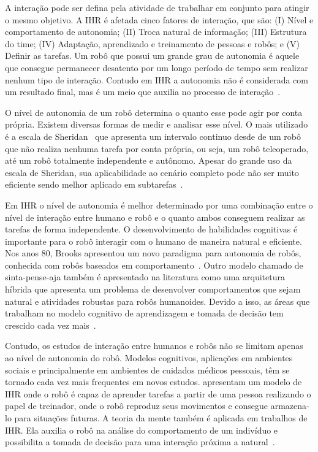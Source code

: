 A interação pode ser defina pela atividade de trabalhar em conjunto para atingir o mesmo objetivo. A IHR é afetada cinco fatores de interação, que são: (I) Nível e comportamento de autonomia; (II) Troca natural de informação; (III) Estrutura do time; (IV) Adaptação, aprendizado e treinamento de pessoas e robôs; e (V) Definir as tarefas. Um robô que possui um grande grau de autonomia é aquele que consegue permanecer desatento por um longo período de tempo sem realizar nenhum tipo de interação. Contudo em IHR a autonomia não é considerada com um resultado final, mas é um meio que auxilia no processo de interação~\cite{Goodrich:2007, Weiss:2010}.

O nível de autonomia de um robô determina o quanto esse pode agir por conta própria. Existem diversas formas de medir e analisar esse nível. O mais utilizado é a escala de Sheridan~\cite{Sheridan:1978} que apresenta um intervalo continuo desde de um robô que não realiza nenhuma tarefa por conta própria, ou seja, um robô teleoperado, até um robô totalmente independente e autônomo. Apesar do grande uso da escala de Sheridan, sua aplicabilidade ao cenário completo pode não ser muito eficiente sendo melhor aplicado em subtarefas~\cite{Goodrich:2007, Weiss:2010}.

Em IHR o nível de autonomia é melhor determinado por uma combinação entre o nível de interação entre humano e robô e o quanto ambos conseguem realizar as tarefas de forma independente. O desenvolvimento de habilidades cognitivas é importante para o robô interagir com o humano de maneira natural e eficiente. Nos anos 80, Brooks apresentou um novo paradigma para autonomia de robôs, conhecida com robôs baseados em comportamento~\cite{Brooks:1986, Brooks:1991}. Outro modelo chamado de sinta-pense-aja também é apresentado na literatura como uma arquitetura híbrida que apresenta um problema de desenvolver comportamentos que sejam natural e atividades robustas para robôs humanoides. Devido a isso, as áreas que trabalham no modelo cognitivo de aprendizagem e tomada de decisão tem crescido cada vez mais~\cite{Goodrich:2007}.

Contudo, os estudos de interação entre humanos e robôs não se limitam apenas ao nível de autonomia do robô. Modelos cognitivos, aplicações em ambientes sociais e principalmente em ambientes de cuidados médicos pessoais, têm se tornado cada vez mais frequentes em novos estudos.  apresentam um modelo de IHR onde o robô é capaz de aprender tarefas a partir de uma pessoa realizando o papel de treinador, onde o robô reproduz seus movimentos e consegue armazena-lo para situações futuras. A teoria da mente também é aplicada em trabalhos de IHR. Ela auxilia o robô na análise do comportamento de um indivíduo e possibilita a tomada de decisão para uma interação próxima a natural~\cite{Hiatt:2011}.

